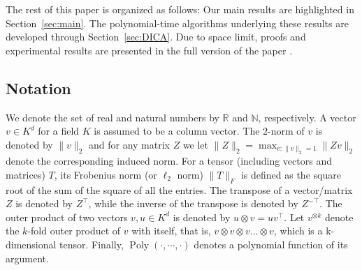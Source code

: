 \documentclass{article} %
\newcommand{\real}{\mathbb{R}}
\renewcommand{\natural}{\mathbb{N}}
\DeclareMathOperator{\pol}{Poly}
\newcommand{\poly}[1]{\pol\left(#1\right)}
\theoremstyle{definition}
\begin{document}
The rest of this paper is organized as follows: 
Our main results are highlighted in Section~\ref{sec:main}.
The polynomial-time algorithms underlying these results are developed through Section~\ref{sec:DICA}.
Due to space limit, proofs and experimental results are presented in the full version of the paper \citep{HuGySz15}.
\fi
 
\subsection{Notation}
We denote the set of real and natural numbers by $\real$ and $\natural$, respectively.
A vector $v \in K^d$ for a field $K$ is assumed to be a column vector.
The $2$-norm of $v$ is denoted by  $\|v\|_2$ and for any matrix $Z$ we let $\|Z\|_2=\max_{v:\|v\|_2=1}{\|Z v\|_2}$ denote the corresponding induced norm. 
For a tensor (including vectors and matrices) $T$, its Frobenius norm (or $\ell_2$ norm) $\|T\|_F$  is defined as the square root of the sum of the square of all the entries.  
The transpose of a vector/matrix $Z$ is denoted by $Z^\top$, while the inverse of the transpose is denoted by $Z^{-\top}$.  
The outer product of two vectors $v, u \in K^d$ is denoted by $u\otimes v=u v^\top$. 
Let $v^{\otimes k}$ denote the $k$-fold outer product of $v$ with itself, that is, $v\otimes v\otimes v \ldots \otimes v$, which is a k-dimensional tensor.
Finally, $\poly{\cdot,\cdots,\cdot}$ denotes a polynomial function of its argument.
\end{document}
